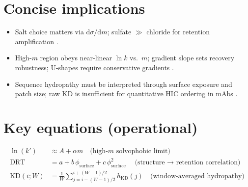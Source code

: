 \documentclass[11pt]{article}
\begin{document}
\section{Concise implications}
\begin{itemize}
\item Salt choice matters via $\mathrm{d}\sigma/\mathrm{d}m$; sulfate $\gg$ chloride for retention amplification \cite{Melander1977,Melander1984,Gregory2022}.
\item High-$m$ region obeys near-linear $\ln k$ vs.\ $m$; gradient slope sets recovery robustness; U-shapes require conservative gradients \cite{Creasy2018}.
\item Sequence hydropathy must be interpreted through surface exposure and patch size; raw KD is insufficient for quantitative HIC ordering in mAbs \cite{Waibl2022,Hebditch2019,Jain2017}.
\end{itemize}

\section*{Key equations (operational)}
\begin{align}
\ln(k') &\approx A + \alpha m \quad\text{(high-$m$ solvophobic limit)} \label{eq:hi-m}\\
\mathrm{DRT} &= a + b\,\phi_{\mathrm{surface}} + c\,\phi_{\mathrm{surface}}^2 \quad\text{(structure $\to$ retention correlation)} \label{eq:drt}\\
\mathrm{KD}(i;W) &= \frac{1}{W}\sum_{j=i-(W-1)/2}^{i+(W-1)/2} h_{\mathrm{KD}}(j) \quad\text{(window-averaged hydropathy)} \label{eq:kd}
\end{align}
\end{document}
